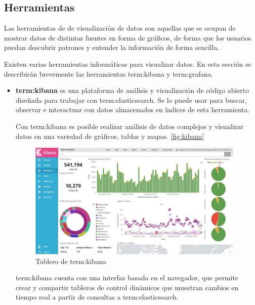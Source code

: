 \subsection{Herramientas}
\label{herramientas-de-visualizacion}

Las herramientas de  de visualización de datos son aquellas que se
ocupan de mostrar datos de distintas fuentes en forma de gráficos, de forma que
los usuarios puedan descubrir patrones y entender la información de forma
sencilla.

Existen varias herramientas informáticas para visualizar datos. En esta sección
se describirán brevemente las herramientas \gls{term:kibana} y
\gls{term:grafana}.

\begin{itemize}

\item
\textbf{\gls{term:kibana}} es una plataforma de análisis y visualización de
código abierto diseñada para trabajar con \gls{term:elasticsearch}. Se lo puede
usar para buscar, observar e interactuar con datos almacenados en índices de
esta herramienta.

Con \gls{term:kibana} es posible realizar análisis de datos complejos y
visualizar datos en una variedad de gráficos, tablas y mapas.
\autoref{fig:kibana}

\begin{figure}
  \includegraphics[width=\linewidth]{src/images/05-capitulo-5/kibana.jpg}
  \caption{Tablero de \gls{term:kibana}}
  \label{fig:kibana}
\end{figure}

\gls{term:kibana} cuenta con una interfaz basada en el navegador, que permite
crear y compartir tableros de control dinámicos que muestran cambios en tiempo
real a partir de consultas a \gls{term:elasticsearch}.


\end{itemize}
